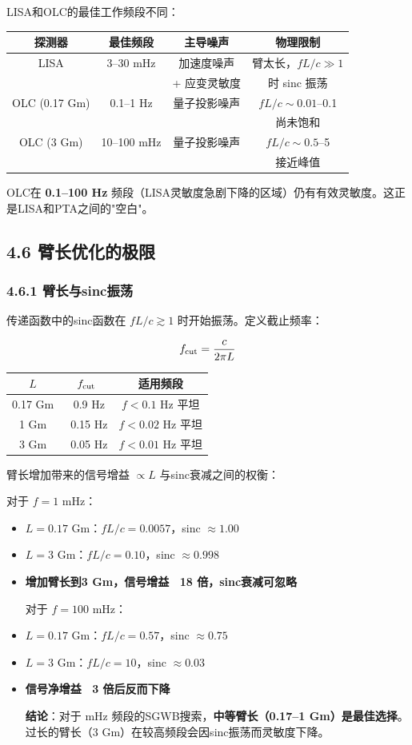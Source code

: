 \documentclass[12pt,a4paper]{article}
\begin{document}
LISA和OLC的最佳工作频段不同：

\begin{tabular}{|c|c|c|c|}
\hline
探测器 & 最佳频段 & 主导噪声 & 物理限制 \\
\hline
LISA & 3–30 mHz & 加速度噪声 & 臂太长，$fL/c \gg 1$ \\
  & & + 应变灵敏度 & 时 sinc 振荡 \\
OLC (0.17 Gm) & 0.1–1 Hz & 量子投影噪声 & $fL/c \sim 0.01$–0.1 \\
  & & & 尚未饱和 \\
OLC (3 Gm) & 10–100 mHz & 量子投影噪声 & $fL/c \sim 0.5$–5 \\
  & & & 接近峰值 \\
\hline
\end{tabular}


OLC在 \textbf{0.1–100 Hz} 频段（LISA灵敏度急剧下降的区域）仍有有效灵敏度。这正是LISA和PTA之间的"空白"。

\subsection{4.6 臂长优化的极限}


\subsubsection{4.6.1 臂长与sinc振荡}


传递函数中的sinc函数在 $fL/c \gtrsim 1$ 时开始振荡。定义截止频率：

$$f_{\rm cut} = \frac{c}{2\pi L}$$

\begin{tabular}{|c|c|c|}
\hline
$L$ & $f_{\rm cut}$ & 适用频段 \\
\hline
0.17 Gm & ~0.9 Hz & $f < 0.1$ Hz 平坦 \\
1 Gm & ~0.15 Hz & $f < 0.02$ Hz 平坦 \\
3 Gm & ~0.05 Hz & $f < 0.01$ Hz 平坦 \\
\hline
\end{tabular}


臂长增加带来的信号增益 $\propto L$ 与sinc衰减之间的权衡：

对于 $f = 1$ mHz：
\begin{itemize}
  \item $L = 0.17$ Gm：$fL/c = 0.0057$，sinc $\approx 1.00$
  \item $L = 3$ Gm：$fL/c = 0.10$，sinc $\approx 0.998$
  \item \textbf{增加臂长到3 Gm，信号增益 ~18 倍，sinc衰减可忽略}

对于 $f = 100$ mHz：
  \item $L = 0.17$ Gm：$fL/c = 0.57$，sinc $\approx 0.75$
  \item $L = 3$ Gm：$fL/c = 10$，sinc $\approx 0.03$
  \item \textbf{信号净增益 ~3 倍后反而下降}

\textbf{结论}：对于 mHz 频段的SGWB搜索，\textbf{中等臂长（0.17–1 Gm）是最佳选择}。过长的臂长（3 Gm）在较高频段会因sinc振荡而灵敏度下降。

\end{itemize}
\end{document}
